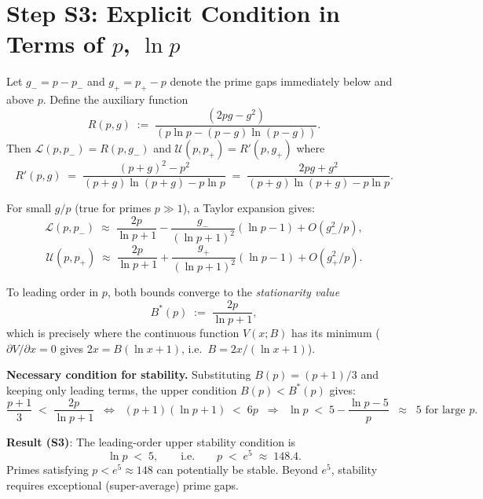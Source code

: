 \documentclass[12pt,a4paper]{article}
\theoremstyle{definition}
\theoremstyle{remark}
\begin{document}
\section{Step S3: Explicit Condition in Terms of $p$, $\ln p$}
\label{sec:pss:s3}

Let $g_- = p - p_-$ and $g_+ = p_+ - p$ denote the prime gaps immediately below
and above $p$.  Define the auxiliary function
\[
  R(p,g) \;:=\; \frac{(2pg - g^2)}{(p\ln p - (p-g)\ln(p-g))}.
\]
Then $\mathcal{L}(p,p_-) = R(p,g_-)$ and
$\mathcal{U}(p,p_+) = R'(p,g_+)$ where
\[
  R'(p,g) \;=\; \frac{(p+g)^2 - p^2}{(p+g)\ln(p+g) - p\ln p}
            \;=\; \frac{2pg + g^2}{(p+g)\ln(p+g) - p\ln p}.
\]

For small $g/p$ (true for primes $p \gg 1$), a Taylor expansion gives:
\[
  \mathcal{L}(p,p_-) \;\approx\; \frac{2p}{\ln p + 1}
    - \frac{g_-}{(\ln p+1)^2}(\ln p - 1) + O(g_-^2/p),
\]
\[
  \mathcal{U}(p,p_+) \;\approx\; \frac{2p}{\ln p + 1}
    + \frac{g_+}{(\ln p+1)^2}(\ln p - 1) + O(g_+^2/p).
\]

To leading order in $p$, both bounds converge to the \emph{stationarity value}
\begin{equation}
  B^*(p) \;:=\; \frac{2p}{\ln p + 1},
  \label{eq:pss:Bstar}
\end{equation}
which is precisely where the continuous function $V(x;B)$ has its minimum
($\partial V/\partial x = 0$ gives $2x = B(\ln x + 1)$, i.e.\ $B = 2x/(\ln x+1)$).

\textbf{Necessary condition for stability.}
Substituting $B(p)=(p+1)/3$ and keeping only leading terms, the upper
condition $B(p) < B^*(p)$ gives:
\begin{equation}
  \frac{p+1}{3} \;<\; \frac{2p}{\ln p + 1}
  \;\;\Longleftrightarrow\;\;
  (p+1)(\ln p + 1) \;<\; 6p
  \;\;\Longrightarrow\;\;
  \ln p \;<\; 5 - \frac{\ln p - 5}{p}
  \;\;\approx\;\; 5 \text{ for large } p.
  \label{eq:pss:S3-upper}
\end{equation}

\begin{resultbox}
\textbf{Result (S3)}: The leading-order upper stability condition is
\[
  \boxed{\ln p \;<\; 5}, \qquad\text{i.e.}\qquad p \;<\; e^5 \;\approx\; 148.4.
\]
Primes satisfying $p < e^5 \approx 148$ can potentially be stable.
Beyond $e^5$, stability requires exceptional (super-average) prime gaps.
\end{resultbox}
\end{document}
